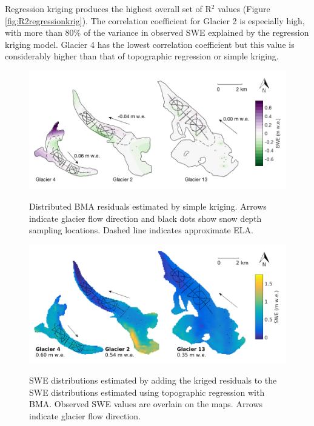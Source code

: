 \documentclass{sfuthesis}
\newcommand{\topomap}{Arrows indicate glacier flow direction and black dots show snow depth sampling locations. }
\newcommand{\swedots}{Observed SWE values are overlain on the maps. }
\begin{document}
Regression kriging produces the highest overall set of R$^2$ values (Figure \ref{fig:R2regressionkrig}). The correlation coefficient for Glacier 2 is especially high, with more than 80\% of the variance in observed SWE explained by the regression kriging model. Glacier 4 has the lowest correlation coefficient but this value is considerably higher than that of topographic regression or simple kriging. 

\begin{figure}[H]
	\centering
	\includegraphics[width = \textwidth]{residualsKriged.png}\\
	\caption{Distributed BMA residuals estimated by simple kriging.  \topomap Dashed line indicates approximate ELA.}
	\label{fig:residualsKRIGING}
\end{figure}

\begin{figure}[H]
	\centering
	\includegraphics[width = \textwidth]{RegressionKriging.png}\\
	\caption{SWE distributions estimated by adding the kriged residuals to the SWE distributions estimated using topographic regression with BMA. \swedots Arrows indicate glacier flow direction.}
	\label{fig:Regression-Kriging}
\end{figure}
\end{document}
